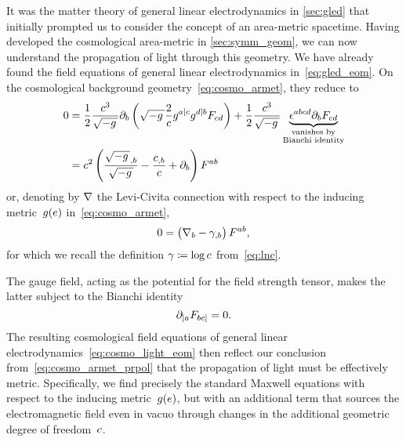It was the matter theory of general linear electrodynamics in \autoref{sec:gled} that initially prompted us to consider the concept of an area-metric spacetime. Having developed the cosmological area-metric in \autoref{sec:symm_geom}, we can now understand the propagation of light through this geometry. We have already found the field equations of general linear electrodynamics in~\eqref{eq:gled_eom}. On the cosmological background geometry~\eqref{eq:cosmo_armet}, they reduce to
\begin{align}
	0&=\frac{1}{2}\frac{c^3}{\sqrt{-g\,}}\partial_b\left(\sqrt{-g\,}\frac{2}{c}g^{a[ c}g^{d] b}F_{cd}\right)+\frac{1}{2}\frac{c^3}{\sqrt{-g\,}}\underbrace{\epsilon^{abcd}\partial_bF_{cd}}_{\substack{\text{vanishes by}\\\text{Bianchi identity}}}\\
	&=c^2\left(\frac{\sqrt{-g\,}_{,b}}{\sqrt{-g\,}}-\frac{c_{,b}}{c}+\partial_b\right)F^{ab}
\end{align}
or, denoting by $\nabla$ the Levi-Civita connection with respect to the inducing metric~$g(e)$ in~\eqref{eq:cosmo_armet},
\begin{equation}\label{eq:cosmo_light_eom}
	0=\left(\nabla_b-\gamma_{,b}\right)F^{ab}
	\mathpunct{,}
\end{equation}
for which we recall the definition $\gamma\coloneqq\log{c}$ from~\eqref{eq:lnc}.

The gauge field, acting as the potential for the field strength tensor, makes the latter subject to the Bianchi identity
\begin{equation}\label{eq:bianchi}
	\partial_{[ a}F_{bc]}=0
	\mathpunct{.}
\end{equation}
The resulting cosmological field equations of general linear electrodynamics~\eqref{eq:cosmo_light_eom} then reflect our conclusion from~\eqref{eq:cosmo_armet_prpol} that the propagation of light must be effectively metric. Specifically, we find precisely the standard Maxwell equations with respect to the inducing \FLRW{} metric~$g(e)$, but with an additional term that sources the electromagnetic field even in vacuo through changes in the additional geometric degree of freedom~$c$.


